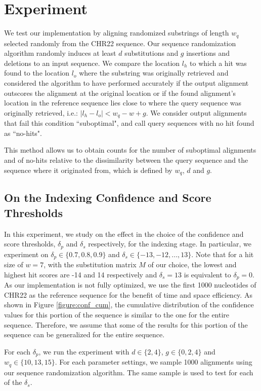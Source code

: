 \documentclass{article}
\begin{document}
\section{Experiment}

We test our implementation by aligning randomized substrings of length $w_q$ selected randomly from the CHR22 sequence. Our sequence randomization algorithm randomly induces at least $d$ substitutions and $g$ insertions and deletions to an input sequence. We compare the location $l_h$ to which a hit was found to the location $l_o$ where the substring was originally retrieved and considered the algorithm to have performed accurately if the output alignment outscores the alignment at the original location or if the found alignment's location in the reference sequence lies close to where the query sequence was originally retrieved, i.e.: $|l_h - l_o| < w_q - w + g$. We consider output alignments that fail this condition ``suboptimal", and call query sequences with no hit found as ``no-hits".

This method allows us to obtain counts for the number of suboptimal alignments and of no-hits relative to the dissimilarity between the query sequence and the sequence where it originated from, which is defined by $w_q$, $d$ and $g$. 

\subsection{On the Indexing Confidence and Score Thresholds}

In this experiment, we study on the effect in the choice of the confidence and score thresholds, $\delta_p$ and $\delta_s$ respectively, for the indexing stage. In particular, we experiment on $\delta_p \in \{0.7, 0.8, 0.9\} $ and $\delta_s \in \{-13, -12, ... , 13\}$. Note that for a hit size of $w = 7$, with the substitution matrix $M$ of our choice, the lowest and highest hit scores are -14 and 14 respectively and $\delta_s = 13$ is equivalent to $\delta_p = 0$. As our implementation is not fully optimized, we use the first 1000 nucleotides of CHR22 as the reference sequence for the benefit of time and space efficiency. As shown in Figure \ref{figure:conf_cum}, the cumulative distribution of the confidence values for this portion of the sequence is similar to the one for the entire sequence. Therefore, we assume that some of the results for this portion of the sequence can be generalized for the entire sequence.

For each $\delta_p$, we run the experiment with $d \in \{2, 4\}$, $g \in \{0, 2, 4\}$ and $w_q \in \{10, 13, 15\}$. For each parameter settings, we sample 1000 alignments using our sequence randomization algorithm. The same sample is used to test for each of the $\delta_s$.
\end{document}
